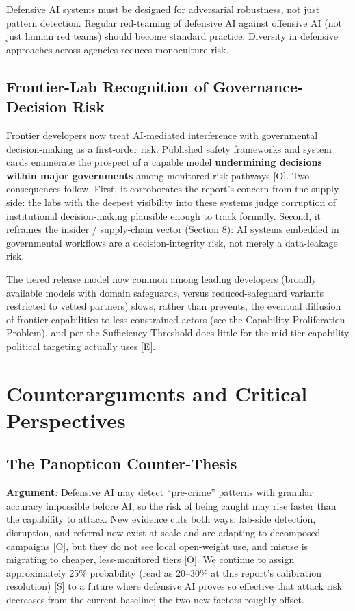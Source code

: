 \documentclass[11pt,letterpaper]{article}
\begin{document}
\begin{recbox}
Defensive AI systems must be designed for adversarial robustness, not just pattern detection. Regular red-teaming of defensive AI against offensive AI (not just human red teams) should become standard practice. Diversity in defensive approaches across agencies reduces monoculture risk.
\end{recbox}

\subsection{Frontier-Lab Recognition of Governance-Decision Risk}

Frontier developers now treat AI-mediated interference with governmental decision-making as a first-order risk. Published safety frameworks and system cards enumerate the prospect of a capable model \textbf{undermining decisions within major governments} among monitored risk pathways [O]. Two consequences follow. First, it corroborates the report's concern from the supply side: the labs with the deepest visibility into these systems judge corruption of institutional decision-making plausible enough to track formally. Second, it reframes the insider / supply-chain vector (Section 8): AI systems embedded in governmental workflows are a decision-integrity risk, not merely a data-leakage risk.

The tiered release model now common among leading developers (broadly available models with domain safeguards, versus reduced-safeguard variants restricted to vetted partners) slows, rather than prevents, the eventual diffusion of frontier capabilities to less-constrained actors (see the Capability Proliferation Problem), and per the Sufficiency Threshold does little for the mid-tier capability political targeting actually uses [E].

\section{Counterarguments and Critical Perspectives}

\subsection{The Panopticon Counter-Thesis}

\textbf{Argument}: Defensive AI may detect ``pre-crime'' patterns with granular accuracy impossible before AI, so the risk of being caught may rise faster than the capability to attack. New evidence cuts both ways: lab-side detection, disruption, and referral now exist at scale and are adapting to decomposed campaigns [O], but they do not see local open-weight use, and misuse is migrating to cheaper, less-monitored tiers [O]. We continue to assign approximately 25\% probability (read as 20--30\% at this report's calibration resolution) [S] to a future where defensive AI proves so effective that attack risk decreases from the current baseline; the two new factors roughly offset.
\end{document}

